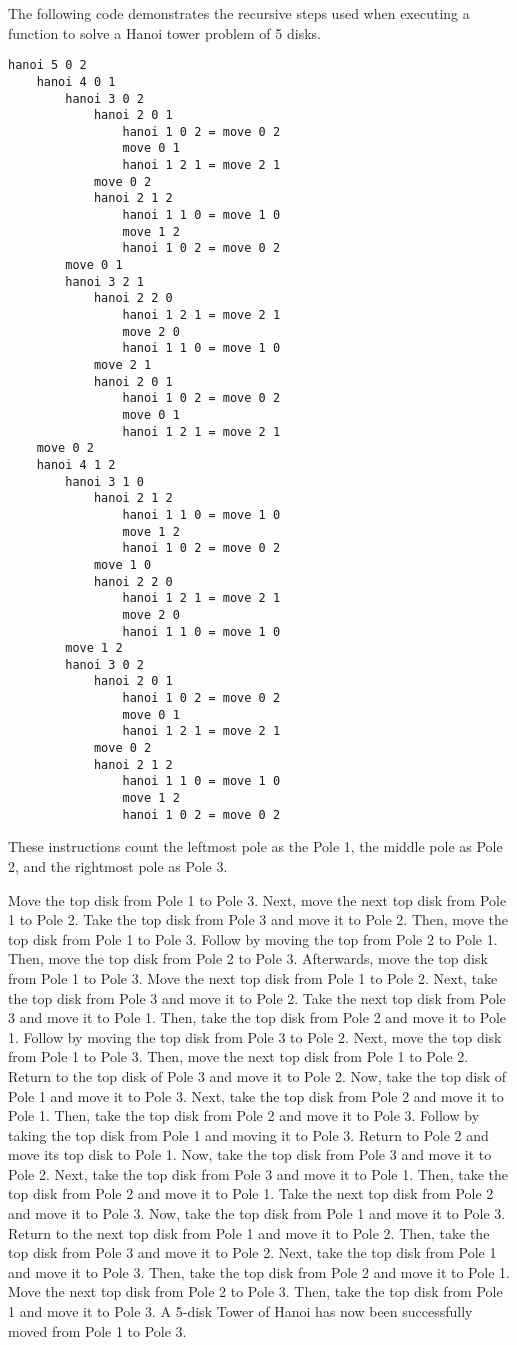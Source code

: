 \documentclass{article}
\theoremstyle{theorem}
\theoremstyle{definition}
\theoremstyle{remark}
\begin{document}
\medskip\noindent
The following code demonstrates the recursive steps used when executing a function to solve a Hanoi tower problem of 5 disks.

\begin{lstlisting}
hanoi 5 0 2
	hanoi 4 0 1
		hanoi 3 0 2
			hanoi 2 0 1
				hanoi 1 0 2 = move 0 2
				move 0 1
				hanoi 1 2 1 = move 2 1
			move 0 2
			hanoi 2 1 2
				hanoi 1 1 0 = move 1 0
				move 1 2
				hanoi 1 0 2 = move 0 2
		move 0 1
		hanoi 3 2 1
			hanoi 2 2 0
				hanoi 1 2 1 = move 2 1
				move 2 0
				hanoi 1 1 0 = move 1 0
			move 2 1
			hanoi 2 0 1
				hanoi 1 0 2 = move 0 2
				move 0 1
				hanoi 1 2 1 = move 2 1
	move 0 2
	hanoi 4 1 2
		hanoi 3 1 0
			hanoi 2 1 2
				hanoi 1 1 0 = move 1 0
				move 1 2
				hanoi 1 0 2 = move 0 2
			move 1 0
			hanoi 2 2 0
				hanoi 1 2 1 = move 2 1
				move 2 0
				hanoi 1 1 0 = move 1 0
		move 1 2
		hanoi 3 0 2
			hanoi 2 0 1
				hanoi 1 0 2 = move 0 2
				move 0 1
				hanoi 1 2 1 = move 2 1
			move 0 2
			hanoi 2 1 2
				hanoi 1 1 0 = move 1 0
				move 1 2
				hanoi 1 0 2 = move 0 2
\end{lstlisting}
%
These instructions count the leftmost pole as the Pole 1, the middle pole as Pole 2, and the rightmost pole as Pole 3.

\medskip\noindent
Move the top disk from Pole 1 to Pole 3. Next, move the next top disk from Pole 1 to Pole 2. Take the top disk from Pole 3 and move it to Pole 2. Then, move the top disk from Pole 1 to Pole 3. Follow by moving the top from Pole 2 to Pole 1. Then, move the top disk from Pole 2 to Pole 3. Afterwards, move the top disk from Pole 1 to Pole 3. Move the next top disk from Pole 1 to Pole 2. Next, take the top disk from Pole 3 and move it to Pole 2. Take the next top disk from Pole 3 and move it to Pole 1. Then, take the top disk from Pole 2 and move it to Pole 1. Follow by moving the top disk from Pole 3 to Pole 2. Next, move the top disk from Pole 1 to Pole 3. Then, move the next top disk from Pole 1 to Pole 2. Return to the top disk of Pole 3 and move it to Pole 2. Now, take the top disk of Pole 1 and move it to Pole 3. Next, take the top disk from Pole 2 and move it to Pole 1. Then, take the top disk from Pole 2 and move it to Pole 3. Follow by taking the top disk from Pole 1 and moving it to Pole 3. Return to Pole 2 and move its top disk to Pole 1. Now, take the top disk from Pole 3 and move it to Pole 2. Next, take the top disk from Pole 3 and move it to Pole 1. Then, take the top disk from Pole 2 and move it to Pole 1. Take the next top disk from Pole 2 and move it to Pole 3. Now, take the top disk from Pole 1 and move it to Pole 3. Return to the next top disk from Pole 1 and move it to Pole 2. Then, take the top disk from Pole 3 and move it to Pole 2. Next, take the top disk from Pole 1 and move it to Pole 3. Then, take the top disk from Pole 2 and move it to Pole 1. Move the next top disk from Pole 2 to Pole 3. Then, take the top disk from Pole 1 and move it to Pole 3. A 5-disk Tower of Hanoi has now been successfully moved from Pole 1 to Pole 3.
\end{document}
